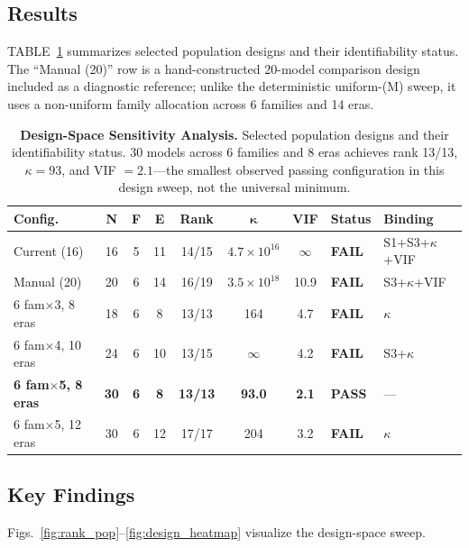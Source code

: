 \documentclass{ieeeaccess}
\theoremstyle{definition}
\theoremstyle{plain}
\begin{document}
\subsection{Results}
TABLE~\ref{tab:design_sweep} summarizes selected population designs and their identifiability status. The ``Manual (20)'' row is a hand-constructed 20-model comparison design included as a diagnostic reference; unlike the deterministic uniform-(M) sweep, it uses a non-uniform family allocation across 6 families and 14 eras.

\begin{table}[!htbp]
\caption{\textbf{Design-Space Sensitivity Analysis.} Selected population designs and their identifiability status. 30 models across 6 families and 8 eras achieves rank 13/13, $\kappa = 93$, and VIF $= 2.1$---the smallest observed passing configuration in this design sweep, not the universal minimum.}
\label{tab:design_sweep}
\centering
\footnotesize
\begin{tabular}{l c c c c c c l l}
\hline
\textbf{Config.} & \textbf{N} & \textbf{F} & \textbf{E} & \textbf{Rank} & $\boldsymbol{\kappa}$ & \textbf{VIF} & \textbf{Status} & \textbf{Binding} \\
\hline
Current (16) & 16 & 5 & 11 & 14/15 & $4.7\!\times\!10^{16}$ & $\infty$ & \textbf{FAIL} & S1+S3+$\kappa$+VIF \\
\hline
Manual (20) & 20 & 6 & 14 & 16/19 & $3.5\!\times\!10^{18}$ & 10.9 & \textbf{FAIL} & S3+$\kappa$+VIF \\
\hline
6 fam$\times$3, 8 eras & 18 & 6 & 8 & 13/13 & 164 & 4.7 & \textbf{FAIL} & $\kappa$ \\
\hline
6 fam$\times$4, 10 eras & 24 & 6 & 10 & 13/15 & $\infty$ & 4.2 & \textbf{FAIL} & S3+$\kappa$ \\
\hline
\textbf{6 fam$\times$5, 8 eras} & \textbf{30} & \textbf{6} & \textbf{8} & \textbf{13/13} & \textbf{93.0} & \textbf{2.1} & \textbf{PASS} & --- \\
\hline
6 fam$\times$5, 12 eras & 30 & 6 & 12 & 17/17 & 204 & 3.2 & \textbf{FAIL} & $\kappa$ \\
\hline
\end{tabular}
\end{table}

\subsection{Key Findings}
Figs.~\ref{fig:rank_pop}--\ref{fig:design_heatmap} visualize the design-space sweep.
\end{document}
